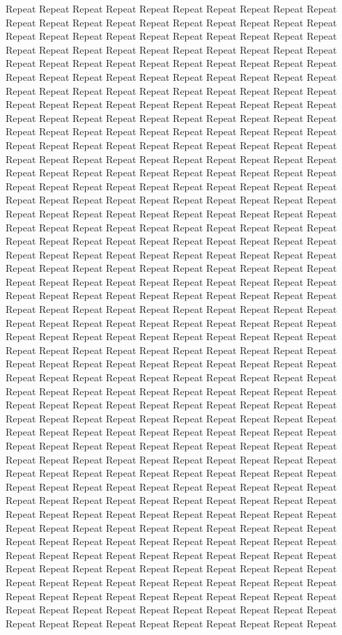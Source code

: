 \documentclass[lettersize,journal]{IEEEtran}
\begin{document}
Repeat Repeat Repeat Repeat Repeat Repeat Repeat Repeat Repeat Repeat Repeat Repeat Repeat Repeat Repeat Repeat Repeat Repeat Repeat Repeat Repeat Repeat Repeat Repeat Repeat Repeat Repeat Repeat Repeat Repeat Repeat Repeat Repeat Repeat Repeat Repeat Repeat Repeat Repeat Repeat Repeat Repeat Repeat Repeat Repeat Repeat Repeat Repeat Repeat Repeat Repeat Repeat Repeat Repeat Repeat Repeat Repeat Repeat Repeat Repeat Repeat Repeat Repeat Repeat Repeat Repeat Repeat Repeat Repeat Repeat Repeat Repeat Repeat Repeat Repeat Repeat Repeat Repeat Repeat Repeat Repeat Repeat Repeat Repeat Repeat Repeat Repeat Repeat Repeat Repeat Repeat Repeat Repeat Repeat Repeat Repeat Repeat Repeat Repeat Repeat Repeat Repeat Repeat Repeat Repeat Repeat Repeat Repeat Repeat Repeat Repeat Repeat Repeat Repeat Repeat Repeat Repeat Repeat Repeat Repeat Repeat Repeat Repeat Repeat Repeat Repeat Repeat Repeat Repeat Repeat Repeat Repeat Repeat Repeat Repeat Repeat Repeat Repeat Repeat Repeat Repeat Repeat Repeat Repeat Repeat Repeat Repeat Repeat Repeat Repeat Repeat Repeat Repeat Repeat Repeat Repeat Repeat Repeat Repeat Repeat Repeat Repeat Repeat Repeat Repeat Repeat Repeat Repeat Repeat Repeat Repeat Repeat Repeat Repeat Repeat Repeat Repeat Repeat Repeat Repeat Repeat Repeat Repeat Repeat Repeat Repeat Repeat Repeat Repeat Repeat Repeat Repeat Repeat Repeat Repeat Repeat Repeat Repeat Repeat Repeat Repeat Repeat Repeat Repeat Repeat Repeat Repeat Repeat Repeat Repeat Repeat Repeat Repeat Repeat Repeat Repeat Repeat Repeat Repeat Repeat Repeat Repeat Repeat Repeat Repeat Repeat Repeat Repeat Repeat Repeat Repeat Repeat Repeat Repeat Repeat Repeat Repeat Repeat Repeat Repeat Repeat Repeat Repeat Repeat Repeat Repeat Repeat Repeat Repeat Repeat Repeat Repeat Repeat Repeat Repeat Repeat Repeat Repeat Repeat Repeat Repeat Repeat Repeat Repeat Repeat Repeat Repeat Repeat Repeat Repeat Repeat Repeat Repeat Repeat Repeat Repeat Repeat Repeat Repeat Repeat Repeat Repeat Repeat Repeat Repeat Repeat Repeat Repeat Repeat Repeat Repeat Repeat Repeat Repeat Repeat Repeat Repeat Repeat Repeat Repeat Repeat Repeat Repeat Repeat Repeat Repeat Repeat Repeat Repeat Repeat Repeat Repeat Repeat Repeat Repeat Repeat Repeat Repeat Repeat Repeat Repeat Repeat Repeat Repeat Repeat Repeat Repeat Repeat Repeat Repeat Repeat Repeat Repeat Repeat Repeat Repeat Repeat Repeat Repeat Repeat Repeat Repeat Repeat Repeat Repeat Repeat Repeat Repeat Repeat Repeat Repeat Repeat Repeat Repeat Repeat Repeat Repeat Repeat Repeat Repeat Repeat Repeat Repeat Repeat Repeat Repeat Repeat Repeat Repeat Repeat Repeat Repeat Repeat Repeat Repeat Repeat Repeat Repeat Repeat Repeat Repeat Repeat Repeat Repeat Repeat Repeat Repeat Repeat Repeat Repeat Repeat Repeat Repeat Repeat Repeat Repeat Repeat Repeat Repeat Repeat Repeat Repeat Repeat Repeat Repeat Repeat Repeat Repeat Repeat Repeat Repeat Repeat Repeat Repeat Repeat Repeat Repeat Repeat Repeat Repeat Repeat Repeat Repeat Repeat Repeat Repeat Repeat Repeat Repeat Repeat Repeat Repeat Repeat Repeat Repeat Repeat Repeat Repeat Repeat Repeat Repeat Repeat Repeat Repeat Repeat Repeat Repeat Repeat Repeat Repeat Repeat Repeat Repeat Repeat Repeat Repeat Repeat Repeat Repeat Repeat 
\end{document}
